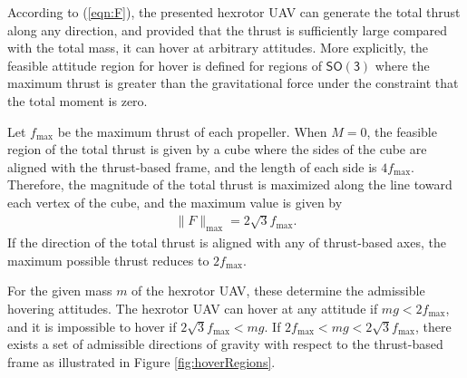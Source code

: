 \documentclass[twocolumn,letterpaper]{IEEEAerospaceCLS}  %
\newcommand{\refeqn}[1]{(\ref{eqn:#1})}
\newcommand{\SO}{\ensuremath{\mathsf{SO(3)}}}
\begin{document}
According to \refeqn{F}, the presented hexrotor UAV can generate the total thrust along any direction, and provided that the thrust is sufficiently large compared with the total mass, it can hover at arbitrary attitudes. More explicitly, the feasible attitude region for hover is defined for regions of $\SO$ where the maximum thrust is greater than the gravitational force under the constraint that the total moment is zero.

Let $f_{\max}$ be the maximum thrust of each propeller. When $M=0$, the feasible region of the total thrust is given by a cube where the sides of the cube are aligned with the thrust-based frame, and the length of each side is $4f_{\max}$. Therefore, the magnitude of the total thrust is maximized along the line toward each vertex of the cube, and the maximum value is given by
\begin{align*}
\|F\|_{\max} = 2\sqrt{3} f_{\max}.
\end{align*}
If the direction of the total thrust is aligned with any of thrust-based axes, the maximum possible thrust reduces to $2f_{\max}$. 

For the given mass $m$ of the hexrotor UAV, these determine the admissible hovering attitudes. The hexrotor UAV can hover at any attitude if $mg<2f_{\max}$, and it is impossible to hover if $2\sqrt{3}f_{\max} <mg$. If $2f_{\max}< mg < 2\sqrt{3}f_{\max}$, there exists a set of admissible directions of gravity with respect to the thrust-based frame as illustrated in Figure \ref{fig:hoverRegions}. 




\end{document}
